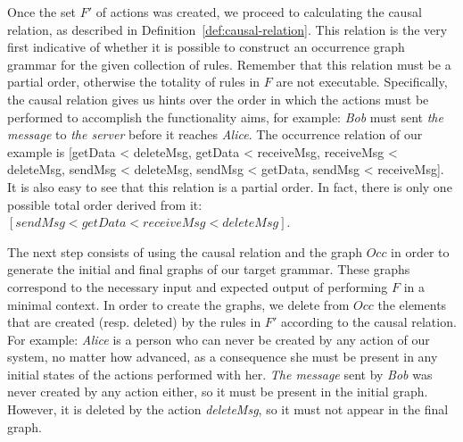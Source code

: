 Once the set $F'$ of actions was created, we proceed to calculating the causal relation, as described in Definition~\ref{def:causal-relation}. This relation is the very first indicative of whether it is possible to construct an occurrence graph grammar for the given collection of rules. Remember that this relation must be a partial order, otherwise the totality of rules in $F$ are not executable. Specifically, the causal relation gives us hints over the order in which the actions must be performed to accomplish the functionality aims, for example: \textit{Bob} must sent \textit{the message} to \textit{the server} before it reaches \textit{Alice}. The occurrence relation of our example is [getData < deleteMsg, getData < receiveMsg, receiveMsg < deleteMsg, sendMsg < deleteMsg, sendMsg < getData, sendMsg < receiveMsg]. It is also easy to see that this relation is a partial order. In fact, there is only one possible total order derived from it: $[sendMsg < getData < receiveMsg < deleteMsg]$.

The next step consists of using the causal relation and the graph $Occ$ in order to generate the initial and final graphs of our target grammar. These graphs correspond to the necessary input and expected output of performing $F$ in a minimal context. In order to create the graphs, we delete from $Occ$ the elements that are created (resp. deleted) by the rules in $F'$ according to the causal relation. For example: \textit{Alice} is a person who can never be created by any action of our system, no matter how advanced, as a consequence she must be present in any initial states of the actions performed with her. \textit{The message} sent by \textit{Bob} was never created by any action either, so it must be present in the initial graph. However, it is deleted by the action \emph{deleteMsg}, so it must not appear in the final graph.

